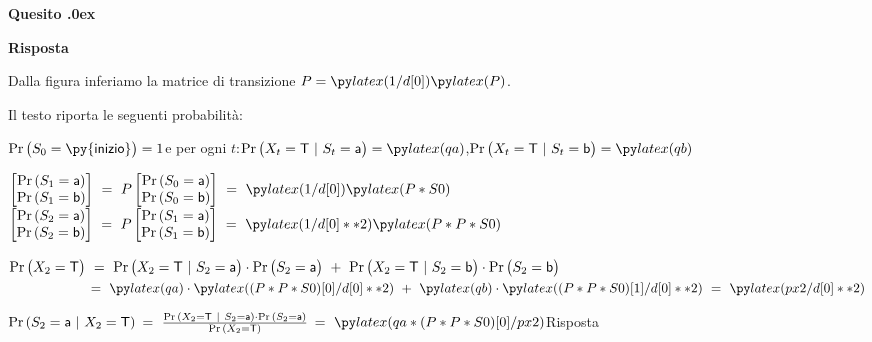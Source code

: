\documentclass[11pt,twoside,a4paper]{article}
\newcounter{quesito}
\newenvironment{question}{\bigskip\addtocounter{quesito}{1}\bigskip\bigskip\par\textbf{Quesito \thequesito.\kern0ex}}{\par\vspace{\parskip}}
\newenvironment{answer}{\par\textbf{Risposta\quad}}{\par\vspace{\parskip}}
\begin{document}
\begin{question}
\begin{answer}

Dalla figura inferiamo la matrice di transizione $P=\pyl{1/d[0]}\pyl{P}$. 

Il testo riporta le seguenti probabilità:

$\Pr\big(S_0={\sf  \py{inizio}}\big)=1$\hfill e per ogni $t$:\quad  $\Pr\big(X_t={\sf T}~|~S_t={\sf a}\big)=\pyl{qa}$,\hfill $\Pr\big(X_t={\sf T}~|~S_t={\sf b}\big)=\pyl{qb}$
\bigskip


$\begin{bmatrix}\Pr(S_1={\sf a})\\\Pr(S_1={\sf b})\end{bmatrix}
\ =\ 
P\begin{bmatrix}\Pr(S_0={\sf a})\\\Pr(S_0={\sf b})\end{bmatrix}
\ =\ 
\pyl{1/d[0]}\pyl{P*S0}$
\hfil
$\begin{bmatrix}\Pr(S_2={\sf a})\\\Pr(S_2={\sf b})\end{bmatrix}
\ =\ 
P\begin{bmatrix}\Pr(S_1={\sf a})\\\Pr(S_1={\sf b})\end{bmatrix}
\ =\  
\pyl{1/d[0]**2}\pyl{P*P*S0}$

\medskip
$\Pr\big(X_2={\sf T}\big)\ =\ \Pr\big(X_2={\sf T}~|~S_2={\sf a}\big)\cdot\Pr\big(S_2={\sf a}\big) \ + \ \Pr\big(X_2={\sf T}~|~S_2={\sf b}\big)\cdot\Pr\big(S_2={\sf b}\big)$
\\[2ex]
$\phantom{\Pr\big(X_2={\sf T}\big)}\ =\ \pyl{qa}\cdot\pyl{(P*P*S0)[0]/d[0]**2} \ + \ \pyl{qb}\cdot\pyl{(P*P*S0)[1]/d[0]**2}\ =\ \pyl{px2/d[0]**2}$

\bigskip
{\color{blue}$\Pr(S_2={\sf a}~|~X_2={\sf T})$}$\ =\ \frac{\Pr(X_2={\sf T}~|~S_2={\sf a})\cdot\Pr(S_2={\sf a})}{\Pr(X_2={\sf T})}${\color{blue}$\ =\ \pyl{qa*(P*P*S0)[0]/px2}$\hfill Risposta} 
\end{answer}
\end{question}
\end{document}
